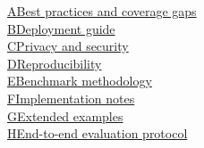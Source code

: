 \noindent\hyperref[app:best-practices]{A\hspace{1em}Best practices and coverage gaps}\\
\noindent\hyperref[app:deployment]{B\hspace{1em}Deployment guide}\\
\noindent\hyperref[app:privacy]{C\hspace{1em}Privacy and security}\\
\noindent\hyperref[app:reproducibility]{D\hspace{1em}Reproducibility}\\
\noindent\hyperref[app:benchmark-methodology]{E\hspace{1em}Benchmark methodology}\\
\noindent\hyperref[app:implementation]{F\hspace{1em}Implementation notes}\\
\noindent\hyperref[app:extended-examples]{G\hspace{1em}Extended examples}\\
\noindent\hyperref[app:e2e-eval]{H\hspace{1em}End-to-end evaluation protocol}

\vspace{2em}
